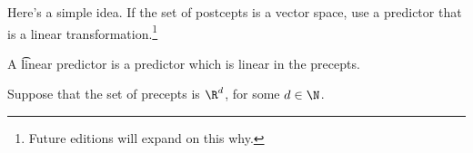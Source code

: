 

Here's a simple idea.
If the set of postcepts is a vector space, use a predictor that is a linear transformation.\footnote{Future editions will expand on this why.}


A \t{linear predictor} is a predictor which is linear in the precepts.


Suppose that the set of precepts is $\R^d$, for some $d \in \N$.

\blankpage
